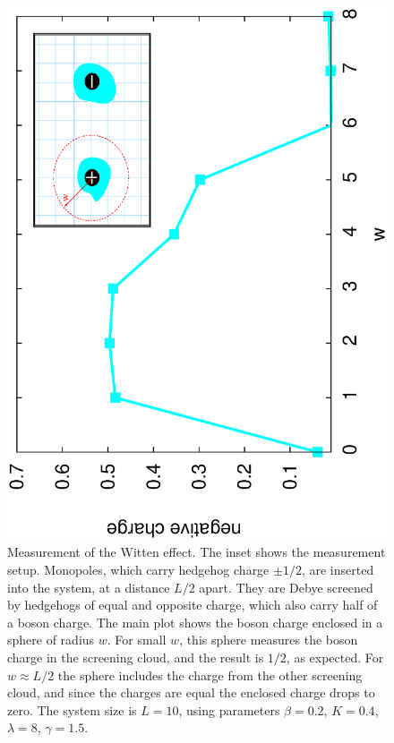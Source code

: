 \documentclass[prb,twocolumn]{revtex4-1}
\newcommand{\scripty}[1]{w}
\begin{document}
\begin{figure}
\includegraphics[angle=-90,width=0.9\linewidth]{figures/wittenout.eps}
\caption{Measurement of the Witten effect. The inset shows the measurement setup. Monopoles, which carry hedgehog charge $\pm 1/2$, are inserted into the system, at a distance $L/2$ apart. They are Debye screened by hedgehogs of equal and opposite charge, which also carry half of a boson charge. The main plot shows the boson charge enclosed in a sphere of radius $\scripty{r}$. For small $\scripty{r}$, this sphere measures the boson charge in the screening cloud, and the result is $1/2$, as expected. For $\scripty{r}\approx L/2$ the sphere includes the charge from the other screening cloud, and since the charges are equal the enclosed charge drops to zero. The system size is $L=10$, using parameters $\beta=0.2$, $K=0.4$, $\lambda=8$, $\gamma=1.5$.}
\label{witten}
\end{figure}
\end{document}
